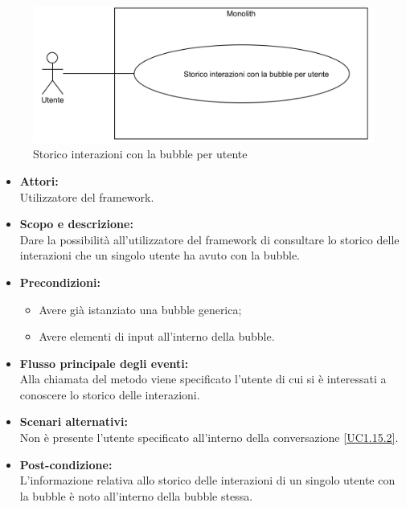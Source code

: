 
\begin{figure}[H]
	\centering
	\includegraphics[width=15cm]{../../documenti/AnalisiDeiRequisiti/Diagrammi_img/uc1_15.png}
	\caption{\UCCCaption{} Storico interazioni con la bubble per utente}
\end{figure}

\begin{itemize}
	\item \textbf{Attori:}
	\\Utilizzatore del framework.
	\item \textbf{Scopo e descrizione:} 
	\\Dare la possibilità all'utilizzatore del framework di consultare lo storico delle interazioni che un singolo utente ha avuto con la bubble.
	\item \textbf{Precondizioni:}
	\begin{itemize}
		\item Avere già istanziato una bubble generica;
		\item Avere elementi di input all'interno della bubble.
	\end{itemize}
	\item \textbf{Flusso principale degli eventi:}
	\\Alla chiamata del metodo viene specificato l'utente di cui si è interessati a conoscere lo storico delle interazioni.
	\item \textbf{Scenari alternativi:}
	\\Non è presente l'utente specificato all'interno della conversazione \ref{UC1.15.2}.
	\item \textbf{Post-condizione:}
	\\L'informazione relativa allo storico delle interazioni di un singolo utente con la bubble è noto all'interno della bubble stessa.
\end{itemize}


